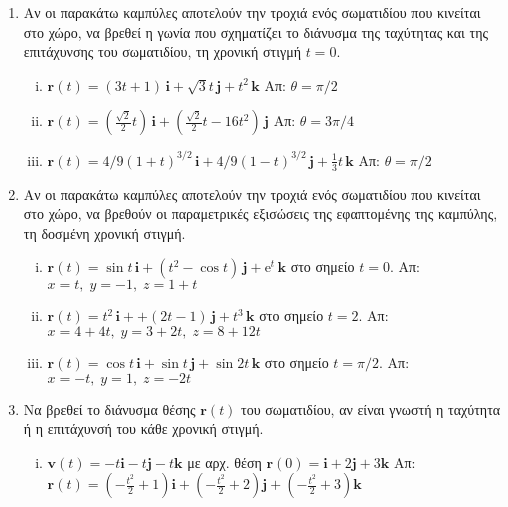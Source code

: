 \begin{enumerate}
  \item Αν οι παρακάτω καμπύλες αποτελούν την τροχιά ενός σωματιδίου που κινείται 
    στο χώρο, να βρεθεί η γωνία που σχηματίζει το διάνυσμα της ταχύτητας και της 
    επιτάχυνσης του σωματιδίου, τη χρονική στιγμή $ t=0 $.
    \begin{enumerate}[i)]
      \item $ \mathbf{r}(t)=(3t+1)\, \mathbf{i} + \sqrt{3} t\, \mathbf{j} + t^{2} \, 
        \mathbf{k} $
        \hfill Απ: $ \theta = \pi /2 $
      \item $ \mathbf{r}(t)=(\frac{\sqrt{2}}{2} t)\, \mathbf{i} + 
        (\frac{\sqrt{2}}{2} t-16t^{2})\, \mathbf{j} $
        \hfill Απ: $ \theta = 3\pi /4 $ 
      \item $ \mathbf{r}(t)=4/9(1+t)^{3/2}\, \mathbf{i} + 4/9(1-t)^{3/2}\, \mathbf{j} + 
        \frac{1}{3} t\, \mathbf{k} $
        \hfill Απ: $ \theta = \pi /2 $ 
    \end{enumerate}

  \item Αν οι παρακάτω καμπύλες αποτελούν την τροχιά ενός σωματιδίου που κινείται 
    στο χώρο, να βρεθούν οι παραμετρικές εξισώσεις της εφαπτομένης της καμπύλης, τη 
    δοσμένη χρονική στιγμή.
    \begin{enumerate}[i)]
      \item $ \mathbf{r}(t)= \sin{t}\, \mathbf{i} + (t^{2}- \cos{t})\, \mathbf{j} +
        \mathrm{e}^{t} \, \mathbf{k} $ στο σημείο $ t=0 $.
        \hfill Απ: $ x=t,\;y=-1,\;z=1+t $ 
      \item $ \mathbf{r}(t)=t^{2}\, \mathbf{i} + +(2t-1)\, \mathbf{j} + t^3 \, \mathbf{k}
        $ στο σημείο $ t=2 $.
        \hfill Απ: $ x=4+4t,\;y=3+2t,\;z=8+12t $
      \item $ \mathbf{r}(t)= \cos{t}\, \mathbf{i} + \sin{t}\, \mathbf{j} + \sin{2t} \,
        \mathbf{k} $ στο σημείο $ t= \pi /2 $. 
        \hfill Απ: $ x=-t,\;y= 1,\; z=-2t $
    \end{enumerate}

  \item Να βρεθεί το διάνυσμα θέσης $ \mathbf{r}(t) $ του σωματιδίου, αν είναι γνωστή η
    ταχύτητα ή η επιτάχυνσή του κάθε χρονική στιγμή.
    \begin{enumerate}[i)]
      \item $ \mathbf{v}(t) = -t \mathbf{i}- t \mathbf{j}- t \mathbf{k} $ με αρχ.
        θέση $ \mathbf{r}(0)= \mathbf{i}+2 \mathbf{j}+3 \mathbf{k} $
        \hfill Απ: $ \mathbf{r}(t) = (-\frac{t^{2}}{2} +1) \mathbf{i}+(-
        \frac{t^{2}}{2} +2) \mathbf{j}+ (- \frac{t^{2}}{2} +3) \mathbf{k} $ 


\end{enumerate}
\end{enumerate}
